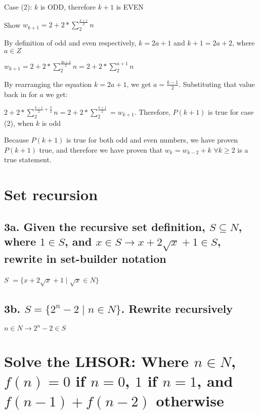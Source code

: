 \documentclass{article}
\begin{document}
\noindent Case (2): $k$ is ODD, therefore $k + 1$ is EVEN \par
\noindent Show $w_{k + 1} = 2 + 2 * \sum_{2}^{\frac{k + 1}{2}}n$ \par
\noindent By definition of odd and even respectively, $k = 2a + 1$ and $k + 1 = 2a + 2$, where $a \in Z$ \par\noindent
$w_{k + 1} = 2 + 2 * \sum_{2}^{\frac{2a + 2}{2}}n = 2 + 2 * \sum_{2}^{a + 1}n$ \par\noindent
By rearranging the equation $k = 2a + 1$, we get $a = \frac{k - 1}{2}$.  Substituting that value back in for $a$ we get: \par\noindent
$2 + 2 * \sum_{2}^{\frac{k - 1}{2} + \frac{2}{2}}n = 2 + 2 * \sum_{2}^{\frac{k + 1}{2}} = w_{k + 1}$.  Therefore, $P(k + 1)$ is true for case (2), when $k$ is odd \par\vspace{0.5cm}

\noindent Because $P(k + 1)$ is true for both odd and even numbers, we have proven $P(k + 1)$ true, and therefore we have proven that $w_{k} = w_{k - 2} + k$ $\forall k \geq 2$ is a true statement.

\section{Set recursion}

\subsection{3a. Given the recursive set definition, $S \subseteq N$, where $1 \in S$, and $x \in S \rightarrow x + 2\sqrt{x} + 1 \in S$, rewrite in set-builder notation}

$S$ $= \{x + 2\sqrt{x} + 1 \mid \sqrt{x} \in N\}$
\par\vspace{0.5cm}

\subsection{3b. $S = \{2^{n} - 2 \mid n \in N\}$.  Rewrite recursively}

$n \in N \rightarrow 2^{n} - 2 \in S$

\section{Solve the LHSOR: Where $n \in N$, $f(n) = 0$ if $n = 0$, $1$ if $n = 1$, and $f(n - 1) + f(n - 2)$ otherwise}
\end{document}
